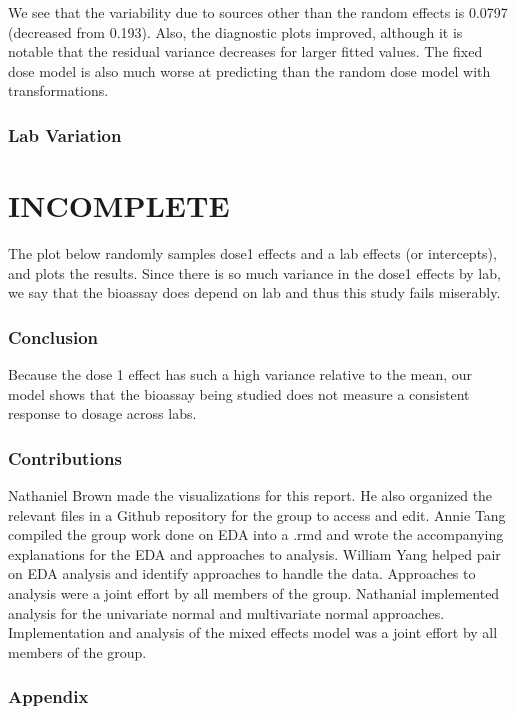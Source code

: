 \documentclass[]{article}
\begin{document}
We see that the variability due to sources other than the random effects
is 0.0797 (decreased from 0.193). Also, the diagnostic plots improved,
although it is notable that the residual variance decreases for larger
fitted values. The fixed dose model is also much worse at predicting
than the random dose model with transformations.

\subsubsection{Lab Variation}\label{lab-variation}

\section{INCOMPLETE}\label{incomplete}

The plot below randomly samples dose1 effects and a lab effects (or
intercepts), and plots the results. Since there is so much variance in
the dose1 effects by lab, we say that the bioassay does depend on lab
and thus this study fails miserably.

\subsubsection{Conclusion}\label{conclusion}

Because the dose 1 effect has such a high variance relative to the mean,
our model shows that the bioassay being studied does not measure a
consistent response to dosage across labs.

\subsubsection{Contributions}\label{contributions}

Nathaniel Brown made the visualizations for this report. He also
organized the relevant files in a Github repository for the group to
access and edit. Annie Tang compiled the group work done on EDA into a
.rmd and wrote the accompanying explanations for the EDA and approaches
to analysis. William Yang helped pair on EDA analysis and identify
approaches to handle the data. Approaches to analysis were a joint
effort by all members of the group. Nathanial implemented analysis for
the univariate normal and multivariate normal approaches. Implementation
and analysis of the mixed effects model was a joint effort by all
members of the group.

\subsubsection{Appendix}\label{appendix}
\end{document}
